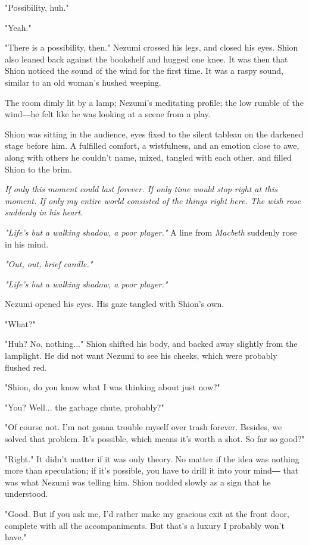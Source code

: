 "Possibility, huh."

"Yeah."

"There is a possibility, then." Nezumi crossed his legs, and closed his
eyes. Shion also leaned back against the bookshelf and hugged one knee.
It was then that Shion noticed the sound of the wind for the first time.
It was a raspy sound, similar to an old woman's hushed weeping.

The room dimly lit by a lamp; Nezumi's meditating profile; the low
rumble of the wind―he felt like he was looking at a scene from a play.

Shion was sitting in the audience, eyes fixed to the silent tableau on
the darkened stage before him. A fulfilled comfort, a wistfulness, and
an emotion close to awe, along with others he couldn't name, mixed,
tangled with each other, and filled Shion to the brim.

\emph{If only this moment could last forever. If only time would stop right at
	this moment. If only my entire world consisted of the things right here.
	The wish rose suddenly in his heart.}

\emph{"Life's but a walking shadow, a poor player."} A line from \emph{Macbeth}
suddenly rose in his mind.

\emph{"Out, out, brief candle."}

\emph{"Life's but a walking shadow, a poor player."}

Nezumi opened his eyes. His gaze tangled with Shion's own.

"What?"

"Huh? No, nothing..." Shion shifted his body, and backed away slightly
from the lamplight. He did not want Nezumi to see his cheeks, which were
probably flushed red.

"Shion, do you know what I was thinking about just now?"

"You? Well... the garbage chute, probably?"

"Of course not. I'm not gonna trouble myself over trash forever.
Besides, we solved that problem. It's possible, which means it's worth a
shot. So far so good?"

"Right." It didn't matter if it was only theory. No matter if the idea
was nothing more than speculation; if it's possible, you have to drill
it into your mind― that was what Nezumi was telling him. Shion nodded
slowly as a sign that he understood.

"Good. But if you ask me, I'd rather make my gracious exit at the front
door, complete with all the accompaniments. But that's a luxury I
probably won't have."

